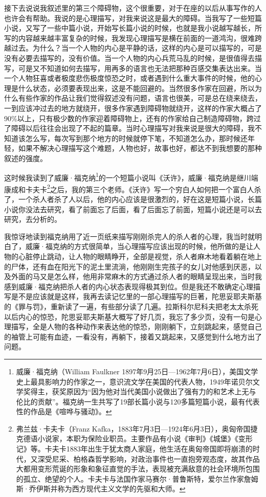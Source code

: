 \documentclass[12pt,a5paper]{ctexbook}
\begin{document}
接下去说说我叙述里的第三个障碍物，这个很重要，对于在座的以后从事写作的人也许会有帮助。我说的是心理描写，对我来说这是最大的障碍。当我写了一些短篇小说，又写了一些中篇小说，开始写长篇小说的时候，也就是我小说越写越长，所写的内容越来越丰富复杂的时候，我发现心理描写是横在前面的一道鸿沟，很难跨越过去。为什么？当一个人物的内心是平静的话，这样的内心是可以描写的，可是没有必要去描写的，没有价值。当一个人物的内心兵荒马乱的时候，是很值得去描写，可是又不知道如何去描写，用再多的语言也无法把那种百感交集表达出来。当一个人物狂喜或者极度悲伤极度惊恐之时，或者遇到什么重大事件的时候，他的心理是什么状态，必须要表现出来，这是不能回避的。当然很多作家在回避，所以为什么有些作家的作品让我们觉得叙述没有问题，语言也很美，可是总在绕来绕去，一到应该冲过去的地方就绕开，很多作家遇到障碍物就绕开，这样的作家大概占了90\%以上，只有极少数的作家迎着障碍物上，还有的作家给自己制造障碍物，跨过了障碍以后往往会出现了不起的篇章。当时心理描写对我来说是很大的障碍，我不知道该怎么写，每次写到那个地方的时候就停下笔，不知道怎么办，那时候还年轻，如果不解决心理描写这个难题，人物也好，故事也好，都达不到我想要的那种叙述的强度。

这时候我读到了威廉·福克纳\footnote{威廉·福克纳（William Faulkner 1897年9月25日—1962年7月6日），美国文学史上最具影响力的作家之一，意识流文学在美国的代表人物，1949年诺贝尔文学奖得主，获奖原因为“因为他对当代美国小说做出了强有力的和艺术上无与伦比的贡献”。福克纳一生共写了19部长篇小说与120多篇短篇小说，最有代表性的作品是《喧哗与骚动》。}的一个短篇小说叫《沃许》，威廉·福克纳是继川端康成和卡夫卡\footnote{弗兰兹·卡夫卡（Franz Kafka，1883年7月3日—1924年6月3日），奥匈帝国捷克德语小说家，本职为保险业职员。主要作品有小说《审判》《城堡》《变形记》等。卡夫卡1883年出生于犹太商人家庭，他生活在奥匈帝国即将崩溃的时代，又深受尼采、柏格森哲学影响，对政治事件也一直抱旁观态度，故其作品大都用变形荒诞的形象和象征直觉的手法，表现被充满敌意的社会环境所包围的孤立、绝望的个人。卡夫卡与法国作家马赛尔·普鲁斯特，爱尔兰作家詹姆斯·乔伊斯并称为西方现代主义文学的先驱和大师。}之后，我的第三个老师。《沃许》写一个穷白人如何把一个富白人杀了，一个杀人者杀了人以后，他的内心应该是很激烈的，好在这是短篇小说，长篇小说你没法去研究，看了前面忘了后面，看了后面忘了前面，短篇小说还是可以去研究，去分析的。

我惊讶地读到福克纳用了近一页纸来描写刚刚杀完人的杀人者的心理，我当时就明白了，威廉·福克纳的方式很简单，当心理描写应该出现的时候，他所做的是让人物的心脏停止跳动，让人物的眼睛睁开，全部是视觉，杀人者麻木地看着躺在地上的尸体，还有血在阳光下的泥土里流淌，他刚刚生完孩子的女儿对他感到厌恶，以及外面的马又是怎么样，他用非常麻木的方式通过杀人者的眼睛呈现出来，当时我感到威廉·福克纳把杀人者的内心状态表现得极其到位。但是我还不敢确定心理描写是不是应该就是这样，我再去读记忆里的一部心理描写的巨著，陀思妥耶夫斯基的《罪与罚》，重新读了一遍，有些部分读了几遍。拉斯科尔尼科夫把老太太杀死以后内心的惊恐，陀思妥耶夫斯基大概写了好几页，我忘了多少页，没有一句是心理描写，全是人物的各种动作来表达他的惊恐，刚刚躺下，立刻跳起来，感觉自己的袖管上可能有血迹，一看没有，再躺下，接着又跳起来，又感觉到什么地方出了问题。
\end{document}
